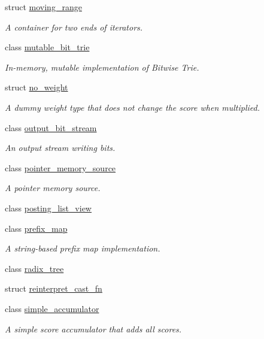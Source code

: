 \begin{DoxyCompactItemize}
struct \mbox{\hyperlink{structirk_1_1moving__range}{moving\+\_\+range}}
\begin{DoxyCompactList}\small\item\em A container for two ends of iterators. \end{DoxyCompactList}\item 
class \mbox{\hyperlink{classirk_1_1mutable__bit__trie}{mutable\+\_\+bit\+\_\+trie}}
\begin{DoxyCompactList}\small\item\em In-\/memory, mutable implementation of Bitwise Trie. \end{DoxyCompactList}\item 
struct \mbox{\hyperlink{structirk_1_1no__weight}{no\+\_\+weight}}
\begin{DoxyCompactList}\small\item\em A dummy weight type that does not change the score when multiplied. \end{DoxyCompactList}\item 
class \mbox{\hyperlink{classirk_1_1output__bit__stream}{output\+\_\+bit\+\_\+stream}}
\begin{DoxyCompactList}\small\item\em An output stream writing bits. \end{DoxyCompactList}\item 
class \mbox{\hyperlink{classirk_1_1pointer__memory__source}{pointer\+\_\+memory\+\_\+source}}
\begin{DoxyCompactList}\small\item\em A pointer memory source. \end{DoxyCompactList}\item 
class \mbox{\hyperlink{classirk_1_1posting__list__view}{posting\+\_\+list\+\_\+view}}
\item 
class \mbox{\hyperlink{classirk_1_1prefix__map}{prefix\+\_\+map}}
\begin{DoxyCompactList}\small\item\em A string-\/based prefix map implementation. \end{DoxyCompactList}\item 
class \mbox{\hyperlink{classirk_1_1radix__tree}{radix\+\_\+tree}}
\item 
struct \mbox{\hyperlink{structirk_1_1reinterpret__cast__fn}{reinterpret\+\_\+cast\+\_\+fn}}
\item 
class \mbox{\hyperlink{classirk_1_1simple__accumulator}{simple\+\_\+accumulator}}
\begin{DoxyCompactList}\small\item\em A simple score accumulator that adds all scores. \end{DoxyCompactList}\item 

\end{DoxyCompactItemize}

